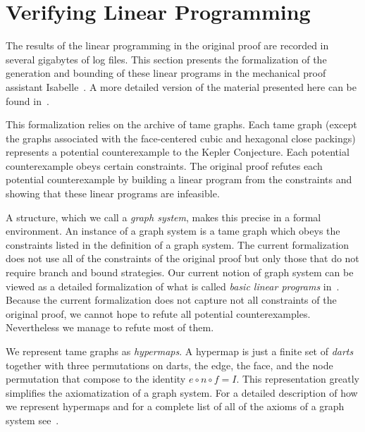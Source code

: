 \documentclass[11pt]{amsart}
\begin{document}
\section{Verifying Linear Programming}
\label{sec:lp}

The results of the linear programming in the original proof are recorded
in several gigabytes of log files.
This section presents the formalization of the generation and bounding of these linear programs 
in the mechanical proof assistant Isabelle~\cite{LNCS2283}. 
A more detailed version of the material presented here can be found in~\cite{obua:phd}.

This formalization relies on the archive of tame graphs. Each tame graph (except the graphs associated with the face-centered cubic and hexagonal close packings) represents a potential counterexample to the Kepler Conjecture. 
Each potential counterexample  obeys certain constraints.  The original
proof refutes each potential counterexample by building a linear program
from the constraints and showing that these linear programs are infeasible.

A structure, which we call a \emph{graph system}, makes this precise
in a formal environment.
An instance of a graph system is a tame graph which obeys the constraints listed in the definition of a graph system.
The current formalization does not use all of the constraints of the original proof but only those that do not require branch and bound strategies. Our current notion of graph system can be viewed
as a detailed formalization of what is called \emph{basic linear programs} in~\cite[sec. 23.3]{Hales:2006:DCG}. 
Because the current formalization does not capture not all constraints of the original proof, we cannot hope to refute all potential counterexamples. Nevertheless we manage to refute most of them.

We represent tame graphs as \emph{hypermaps}. A hypermap is just a finite set of \emph{darts} together
with three permutations on darts, the edge, the face, and the node permutation that compose to the identity $e\circ n\circ f = I$. 
This representation greatly simplifies
the axiomatization of a graph system. For a detailed description of how we represent 
hypermaps and for a complete list of all of the axioms of a graph system see~\cite[sect. 4]{obua:phd}.
\end{document}
